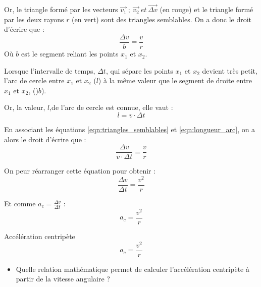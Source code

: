 Or, le triangle formé par les vecteurs \(\vec{v_1} ~ ; ~ \vec{v_2} ~ et ~ \vec{\Delta v}\) (en rouge) et le triangle formé par les deux rayons \(r\) (en vert) sont des triangles semblables.
On a donc le droit d'écrire que :
\begin{equation}
    \frac{\Delta v}{b} = \frac{v}{r}
    \label{eqn:triangles_semblables}
\end{equation}
Où \(b\) est le segment reliant les points \(x_1\) et \(x_2\).

\newpage

Lorsque l'intervalle de temps, \(\Delta t\), qui sépare les points \(x_1\) et \(x_2\) devient très petit, l'arc de cercle entre \(x_1\) et \(x_2\) (\(l\)) à la même valeur que le segment de droite entre \(x_1\) et \(x_2\), ()\(b\)).

Or, la valeur, \(l\),de l'arc de cercle est connue, elle vaut :
\begin{equation}
    l=v \cdot \Delta t
    \label{eqn:longueur_arc}
\end{equation}

En associant les équations \ref{eqn:triangles_semblables} et \ref{eqn:longueur_arc}, on a alors le droit d'écrire que :
\begin{equation}
    \frac{\Delta v}{v \cdot \Delta t} = \frac{v}{r}
\end{equation}

On peur réarranger cette équation pour obtenir :
\begin{equation}
    \frac{\Delta v}{\Delta t}=\frac{v^2}{r}
\end{equation}

Et comme \(a_c=\frac{\Delta v}{\Delta t}\) :
\begin{equation}
    a_c=\frac{v^2}{r}
\end{equation}

\begin{mytheo*}{Accélération centripète}
    \begin{equation}
        a_c=\frac{v^2}{r}
    \end{equation}
\end{mytheo*}

\begin{itemize}[label=\(\rightarrow\)]
    \item Quelle relation mathématique permet de calculer l'accélération centripète à partir de la vitesse angulaire ?
\end{itemize}

\newpage

